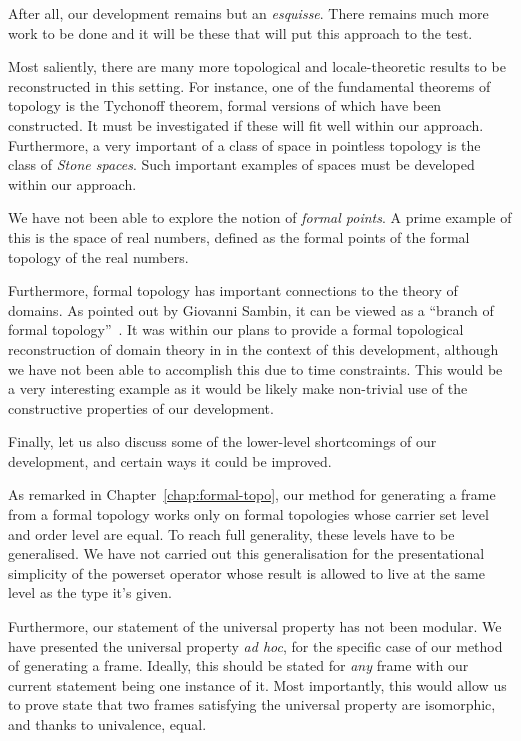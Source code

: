 After all, our development remains but an \emph{esquisse}. There remains much more work to
be done and it will be these that will put this approach to the test.

Most saliently, there are many more topological and locale-theoretic results to be
reconstructed in this setting. For instance, one of the fundamental theorems of topology
is the Tychonoff theorem, formal versions of which have been constructed. It must be
investigated if these will fit well within our approach. Furthermore, a very important of
a class of space in pointless topology is the class of \emph{Stone spaces}. Such important
examples of spaces must be developed within our approach.

We have not been able to explore the notion of \emph{formal points}. A prime example of
this is the space of real numbers, defined as the formal points of the formal topology of
the real numbers.

Furthermore, formal topology has important connections to the theory of domains. As
pointed out by Giovanni Sambin, it can be viewed as a ``branch of formal
topology''~\cite{sambin-domains}. It was within our plans to provide a formal topological
reconstruction of domain theory in \UF{} in the context of this development, although we
have not been able to accomplish this due to time constraints. This would be a very
interesting example as it would be likely make non-trivial use of the constructive
properties of our development.

Finally, let us also discuss some of the lower-level shortcomings of our development, and
certain ways it could be improved.

As remarked in Chapter~\ref{chap:formal-topo}, our method for generating a frame from a
formal topology works only on formal topologies whose carrier set level and order level
are equal. To reach full generality, these levels have to be generalised. We have not
carried out this generalisation for the presentational simplicity of the powerset operator
whose result is allowed to live at the same level as the type it's given.

Furthermore, our statement of the universal property has not been modular. We have
presented the universal property \emph{ad hoc}, for the specific case of our method of
generating a frame. Ideally, this should be stated for \emph{any} frame with our current
statement being one instance of it. Most importantly, this would allow us to prove state
that two frames satisfying the universal property are isomorphic, and thanks to
univalence, equal.


